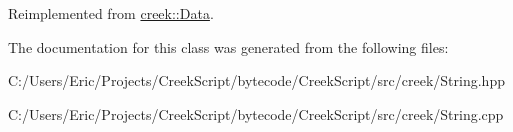 Reimplemented from \hyperlink{classcreek_1_1_data_a32fa079c6f972eae802a5ac5b83d8a07}{creek\+::\+Data}.



The documentation for this class was generated from the following files\+:\begin{DoxyCompactItemize}
\item 
C\+:/\+Users/\+Eric/\+Projects/\+Creek\+Script/bytecode/\+Creek\+Script/src/creek/String.\+hpp\item 
C\+:/\+Users/\+Eric/\+Projects/\+Creek\+Script/bytecode/\+Creek\+Script/src/creek/String.\+cpp\end{DoxyCompactItemize}
